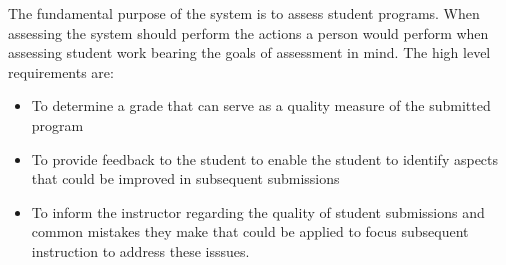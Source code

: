 The fundamental purpose of the system is to assess student programs. When assessing the system should perform the actions a person would perform when assessing student work bearing the goals of assessment  in mind. The high level requirements are:   
\begin{itemize}
\item To determine a grade that can serve as a quality measure of the submitted program
\item To provide feedback to the student to enable the student to identify aspects that could be improved in subsequent submissions
\item To inform the instructor regarding the quality of student submissions and common mistakes they make that could be applied to focus subsequent instruction to address these isssues.
\end{itemize}
 